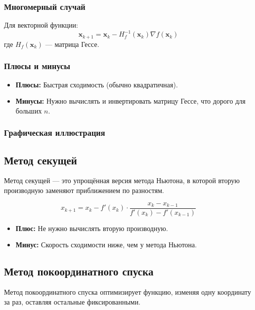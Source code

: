 \subsubsection{Многомерный случай}
Для векторной функции:
\[
\mathbf{x}_{k+1} = \mathbf{x}_k - H_f^{-1}(\mathbf{x}_k) \nabla f(\mathbf{x}_k)
\]
где $H_f(\mathbf{x}_k)$ — матрица Гессе.

\subsubsection{Плюсы и минусы}
\begin{itemize}
    \item \textbf{Плюсы:} Быстрая сходимость (обычно квадратичная).
    \item \textbf{Минусы:} Нужно вычислять и инвертировать матрицу Гессе, что дорого для больших $n$.
\end{itemize}

\subsubsection{Графическая иллюстрация}
\begin{center}
\end{center}

\subsection{Метод секущей}
Метод секущей — это упрощённая версия метода Ньютона, в которой вторую производную заменяют приближением по разностям.

\[
x_{k+1} = x_k - f'(x_k) \cdot \frac{x_k - x_{k-1}}{f'(x_k) - f'(x_{k-1})}
\]

\begin{itemize}
    \item \textbf{Плюс:} Не нужно вычислять вторую производную.
    \item \textbf{Минус:} Скорость сходимости ниже, чем у метода Ньютона.
\end{itemize}

\subsection{Метод покоординатного спуска}
Метод покоординатного спуска оптимизирует функцию, изменяя одну координату за раз, оставляя остальные фиксированными.

